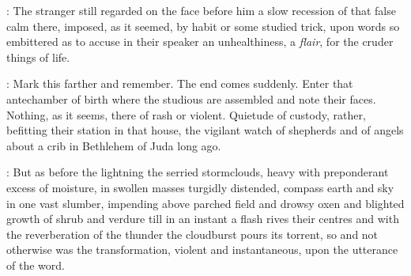 \documentclass[12pt]{article}
\begin{document}
: The stranger still regarded on the face before him a slow recession of
that false calm there, imposed, as it seemed, by habit or some studied
trick, upon words so embittered as to accuse in their speaker an
unhealthiness, a \emph{flair}, for the cruder things of life.


: Mark this farther and remember. The end comes suddenly. Enter that
antechamber of birth where the studious are assembled and note their
faces. Nothing, as it seems, there of rash or violent. Quietude of
custody, rather, befitting their station in that house, the vigilant
watch of shepherds and of angels about a crib in Bethlehem of Juda long
ago.

: But as before the lightning the serried stormclouds, heavy with
preponderant excess of moisture, in swollen masses turgidly distended,
compass earth and sky in one vast slumber, impending above parched field
and drowsy oxen and blighted growth of shrub and verdure till in an
instant a flash rives their centres and with the reverberation of the
thunder the cloudburst pours its torrent, so and not otherwise was the
transformation, violent and instantaneous, upon the utterance of the
word.
\end{document}
